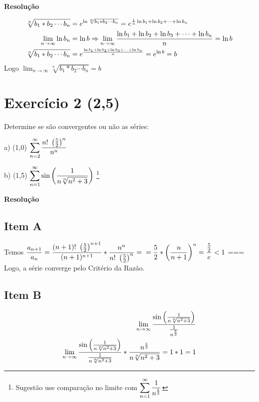 \documentclass[12pt,openany]{book}
\newcommand{\LI}[1][n]{\lim_{{#1} \rightarrow \infty}}
\newcommand{\soma}[2][n]{\sum_{{#1} = #2}^\infty}
\newcommand{\E}[1]{Exercício #1}
\newcommand{\Resolve}{\begin{center} \textbf{Resolução} \end{center}}
\begin{document}
{{\Resolve

\begin{align*}
\sqrt[n]{b_1*b_2\cdots b_n} &= e^{\ln{\sqrt[n]{b_1*b_2\cdots b_n}}} = e^{{1 \over n} \ln{b_1} + \ln{b_2} + \cdots + \ln{b_n}}\\
\LI \ln{b_n} &= \ln{b} \Rightarrow \LI {\ln{b_1} + \ln{b_2} + \ln{b_3} + \cdots + \ln{b_n} \over n} = \ln{b} \\
\sqrt[n]{b_1*b_2\cdots b_n} &= e^{\ln{b_1} + \ln{b_2} + \ln{b_3} + \cdots + \ln{b_n} \over n} = e^{\ln{b}} = b \\
\end{align*}
Logo $\displaystyle{\LI \sqrt[n]{b_1*b_2\cdots b_n} = b}$

\newpage

\section*{\E{2} (2,5)} {Determine se são convergentes ou não as séries:}
\begin{multicols}{2}
a) (1,0) $\displaystyle{\soma{2} {n! \ \left({5 \over 2}\right)^n \over n^n}}$

b) (1,5) $\displaystyle{\soma{1} \sin{\left( {1 \over n \sqrt[n]{n^2 + 3}} \right)}}$ \footnote{Sugestão use comparação no limite com $\displaystyle{\soma{1} {1 \over n^{5 \over 3}}}$}
\end{multicols}

\Resolve

\begin{multicols}{2}
\subsection*{Item A}
Temos $\displaystyle{{a_{n+1} \over a_n} = {(n+1)!\ \left({5 \over 2}\right)^{n+1} \over (n+1)^{n+1}}*{n^n \over n! \ \left({5 \over 2}\right)^n}} = \\ = {5 \over 2}*\left({n \over n+1}\right)^n = {{5 \over 2} \over e} < 1$
===
Logo, a série converge pelo Critério da Razão.

\subsection*{Item B}
\begin{align*}
\LI {\sin{\left( {1 \over n \sqrt[n]{n^2 + 3}} \right)} \over {1 \over n^{5 \over 3}}} \\
\LI {\sin{\left( {1 \over n \sqrt[n]{n^2 + 3}} \right)} \over {1 \over n \sqrt[n]{n^2 + 3}}}*{n^{5 \over 3} \over n \sqrt[n]{n^2 + 3}} = 1*1 = 1 \\
\end{align*}


\end{multicols}}}
\end{document}
